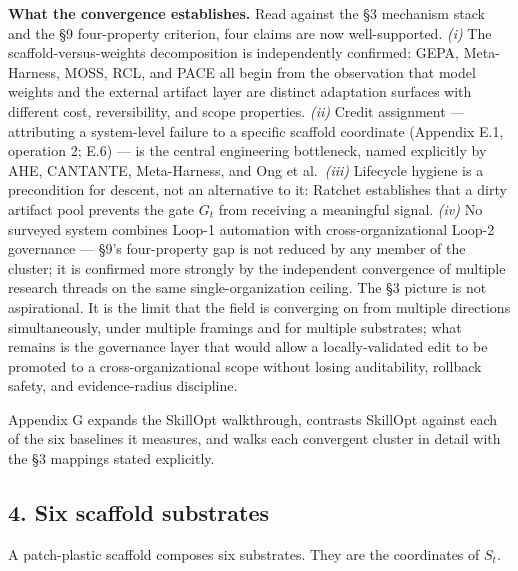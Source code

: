 \documentclass[
]{article}
\begin{document}
\textbf{What the convergence establishes.} Read against the §3 mechanism
stack and the §9 four-property criterion, four claims are now
well-supported. \emph{(i)} The scaffold-versus-weights decomposition is
independently confirmed: GEPA, Meta-Harness, MOSS, RCL, and PACE all
begin from the observation that model weights and the external artifact
layer are distinct adaptation surfaces with different cost,
reversibility, and scope properties. \emph{(ii)} Credit assignment ---
attributing a system-level failure to a specific scaffold coordinate
(Appendix E.1, operation 2; E.6) --- is the central engineering
bottleneck, named explicitly by AHE, CANTANTE, Meta-Harness, and Ong et
al.~\emph{(iii)} Lifecycle hygiene is a precondition for descent, not an
alternative to it: Ratchet establishes that a dirty artifact pool
prevents the gate \(G_t\) from receiving a meaningful signal.
\emph{(iv)} No surveyed system combines Loop-1 automation with
cross-organizational Loop-2 governance --- §9's four-property gap is not
reduced by any member of the cluster; it is confirmed more strongly by
the independent convergence of multiple research threads on the same
single-organization ceiling. The §3 picture is not aspirational. It is
the limit that the field is converging on from multiple directions
simultaneously, under multiple framings and for multiple substrates;
what remains is the governance layer that would allow a
locally-validated edit to be promoted to a cross-organizational scope
without losing auditability, rollback safety, and evidence-radius
discipline.

Appendix G expands the SkillOpt walkthrough, contrasts SkillOpt against
each of the six baselines it measures, and walks each convergent cluster
in detail with the §3 mappings stated explicitly.

\subsection{4. Six scaffold substrates}\label{six-scaffold-substrates}

A patch-plastic scaffold composes six substrates. They are the
coordinates of \(S_t\).
\end{document}
